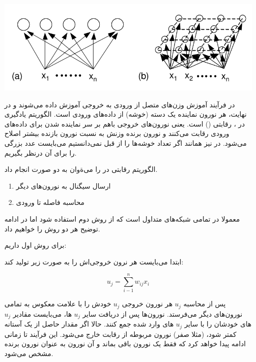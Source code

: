 \begin{enumerate}
\begin{qsolve}
\begin{enumerate}
		\begin{center}
			\includegraphics*[width=0.8\linewidth]{pics/img7.png}
			\label{ساختار شبکه SOM}
		\end{center}
	
	در فرآیند آموزش وزن‌های متصل از ورودی به خروجی آموزش داده می‌شوند و در نهایت، هر نورون نماینده یک دسته (خوشه) از داده‌های ورودی است. الگوریتم یادگیری در ، رقابتی () است. یعنی نورون‌های خروجی باهم بر سر نماینده شدن برای داده‌های ورودی رقابت می‌کنند و نورون برنده وزنش به نسبت نورون بازنده بیشتر اصلاح می‌شود. در  نیز همانند  اگر تعداد خوشه‌ها را از قبل نمی‌دانستیم می‌بایست عدد بزرگی را برای آن درنظر بگیریم. \cite{ref2}
	
	الگوریتم رقابتی در  را می‌ةوان به دو صورت انجام داد.
	
	\begin{enumerate}
		\item ارسال سیگنال به نورون‌های دیگر
		\item محاسبه فاصله تا ورودی
	\end{enumerate}
	
	معمولا در تمامی شبکه‌های  متداول است که از روش دوم استفاده شود اما در ادامه توضیح هر دو روش را خواهیم داد.	
	\end{enumerate}
\end{qsolve}




\begin{qsolve}
برای روش اول داریم:

ابتدا می‌بایست هر نرون خروجی‌اش را به صورت زیر تولید کند:

 $$ u_j=\sum_{i-1}^{n} w_{ij}x_i $$
 
 پس از محاسبه $u_j$ هر نورون خروجی $u_j$ خودش را با علامت معکوس به تمامی نورون‌های دیگر می‌فرستد. نورون‌ها پس از دریافت سایر $u_j$ ها، می‌بایست مقادیر $u_j$ های خودشان را با سایر $u_j$ های وارد شده جمع کنند. حالا اگر مقدار حاصل از یک آستانه کمتر شود، (مثلا صفر) نورون مربوطه از رقابت خارج می‌شود. این فرآیند تا زمانی ادامه پیدا خواهد کرد که فقط یک نورون باقی بماند و آن نورون به عنوان نورون برنده مشخص می‌شود.
 

\end{qsolve}
\end{enumerate}
